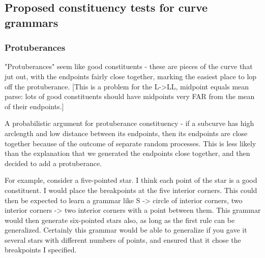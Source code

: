 \documentclass{article}
\begin{document}








\subsection{Proposed constituency tests for curve grammars}

\subsubsection{Protuberances}
"Protuberances" seem like good constituents - these are pieces of the
curve that jut out, with the endpoints fairly close together, marking
the easiest place to lop off the protuberance. [This is a problem for
  the L->LL, midpoint equals mean parse: lots of good constituents
  should have midpoints very FAR from the mean of their endpoints.]

A probabilistic argument for protuberance constituency - if a subcurve
has high arclength and low distance between its endpoints, then its
endpoints are close together because of the outcome of separate random
processes. This is less likely than the explanation that we generated
the endpoints close together, and then decided to add a protuberance.

For example, consider a five-pointed star. I think each point of the
star is a good constituent. I would place the breakpoints at the five
interior corners. This could then be expected to learn a grammar like S
-> circle of interior corners, two interior corners -> two interior
corners with a point between them. This grammar would then generate
six-pointed stars also, as long as the first rule can be generalized.
Certainly this grammar would be able to generalize if you gave it
several stars with different numbers of points, and ensured that it
chose the breakpoints I specified.
\end{document}
